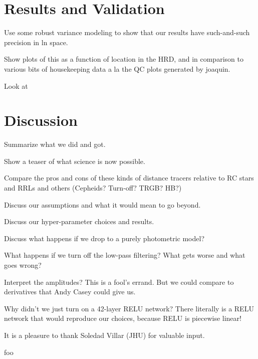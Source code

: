 \documentclass[modern]{aastex631}
\begin{document}
\section{Results and Validation}

Use some robust variance modeling to show that our results have such-and-such precision in ln space.

Show plots of this as a function of location in the HRD, and in comparison to various bits of housekeeping data a la the QC plots generated by joaquin.

Look at 

\section{Discussion}

Summarize what we did and got.

Show a teaser of what science is now possible.

Compare the pros and cons of these kinds of distance tracers relative
to RC stars and RRLs and others (Cepheids? Turn-off? TRGB? HB?)

Discuss our assumptions and what it would mean to go beyond.

Discuss our hyper-parameter choices and results.

Discuss what happens if we drop to a purely photometric model?

What happens if we turn off the low-pass filtering? What gets worse and what goes wrong?

Interpret the amplitudes? This is a fool's errand. But we could compare to derivatives that Andy Casey could give us.

Why didn't we just turn on a 42-layer RELU network? There literally is a RELU network that would reproduce our choices, because RELU is piecewise linear!

\begin{acknowledgements}
It is a pleasure to thank Soledad Villar (JHU) for valuable input.
\end{acknowledgements}


{foo}
\end{document}
